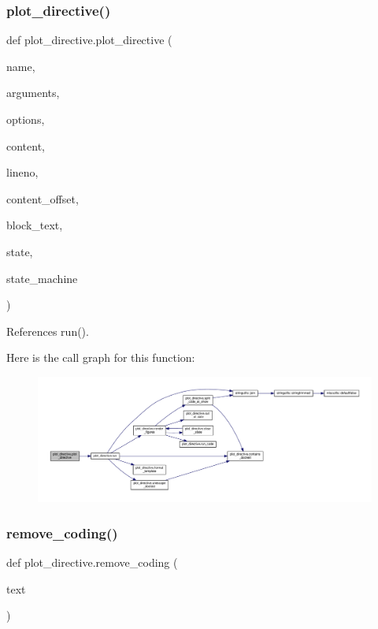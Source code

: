\subsubsection{\texorpdfstring{plot\+\_\+directive()}{plot\_directive()}}
{\footnotesize\ttfamily def plot\+\_\+directive.\+plot\+\_\+directive (\begin{DoxyParamCaption}\item[{}]{name,  }\item[{}]{arguments,  }\item[{}]{options,  }\item[{}]{content,  }\item[{}]{lineno,  }\item[{}]{content\+\_\+offset,  }\item[{}]{block\+\_\+text,  }\item[{}]{state,  }\item[{}]{state\+\_\+machine }\end{DoxyParamCaption})}



References run().

Here is the call graph for this function\+:
\nopagebreak
\begin{figure}[H]
\begin{center}
\leavevmode
\includegraphics[width=350pt]{namespaceplot__directive_a81c752988ceef39206d1d2e4308baeea_cgraph}
\end{center}
\end{figure}
\mbox{\label{namespaceplot__directive_a3b49219dfd6c07286c8ef04b6b479c15}} 
\subsubsection{\texorpdfstring{remove\+\_\+coding()}{remove\_coding()}}
{\footnotesize\ttfamily def plot\+\_\+directive.\+remove\+\_\+coding (\begin{DoxyParamCaption}\item[{}]{text }\end{DoxyParamCaption})}

